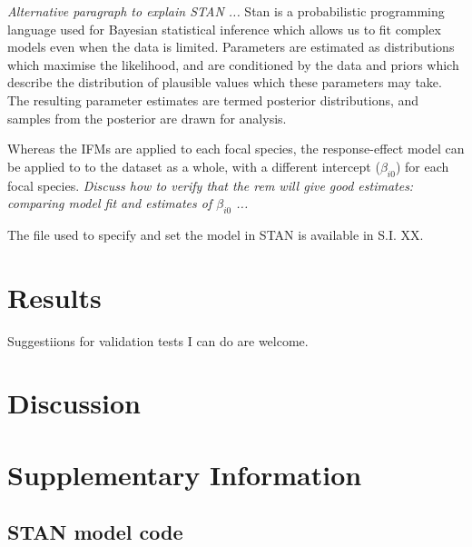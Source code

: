 \documentclass[a4,12pt]{article}
\begin{document}
        \textit{Alternative paragraph to explain STAN ...}
        Stan is a probabilistic programming language used for Bayesian statistical inference which allows us to fit complex models even when the data is limited. Parameters are estimated as distributions which maximise the likelihood, and are conditioned by the data and priors which describe the distribution of plausible values which these parameters may take. The resulting parameter estimates are termed posterior distributions, and samples from the posterior are drawn for analysis.
        
        Whereas the IFMs are applied to each focal species, the response-effect model can be applied to to the dataset as a whole, with a different intercept ($\beta_{i0}$) for each focal species. \textit{Discuss how to verify that the rem will give good estimates: comparing model fit and estimates of $\beta_{i0}$ ...}

        The file used to specify and set the model in STAN is available in S.I. XX. 
    
        

    \section{Results}

    Suggestiions for validation tests I can do are welcome. 


    \section{Discussion}
    

    \section{Supplementary Information}

        \subsection{STAN model code}
\end{document}
